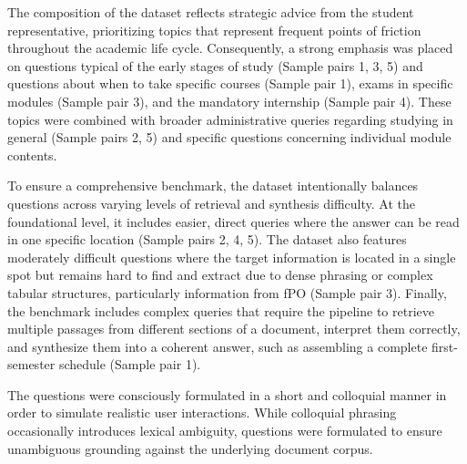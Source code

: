 \documentclass[12pt]{article} %
\begin{document}
The composition of the dataset reflects strategic advice from the student representative, prioritizing topics that represent frequent points of friction throughout the academic life cycle. Consequently, a strong emphasis was placed on questions typical of the early stages of study (Sample pairs 1, 3, 5) and questions about when to take specific courses (Sample pair 1), exams in specific modules (Sample pair 3), and the mandatory internship (Sample pair 4). These topics were combined with broader administrative queries regarding studying in general (Sample pairs 2, 5) and specific questions concerning individual module contents.

To ensure a comprehensive benchmark, the dataset intentionally balances questions across varying levels of retrieval and synthesis difficulty. At the foundational level, it includes easier, direct queries where the answer can be read in one specific location (Sample pairs 2, 4, 5). The dataset also features moderately difficult questions where the target information is located in a single spot but remains hard to find and extract due to dense phrasing or complex tabular structures, particularly information from fPO (Sample pair 3). Finally, the benchmark includes complex queries that require the pipeline to retrieve multiple passages from different sections of a document, interpret them correctly, and synthesize them into a coherent answer, such as assembling a complete first-semester schedule (Sample pair 1).

The questions were consciously formulated in a short and colloquial manner in order to simulate realistic user interactions. While colloquial phrasing occasionally introduces lexical ambiguity, questions were formulated to ensure unambiguous grounding against the underlying document corpus.
\end{document}
